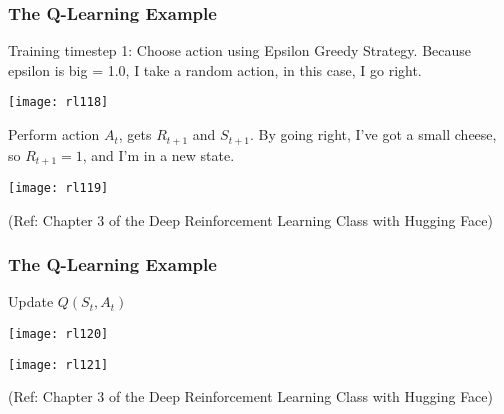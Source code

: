 \begin{frame}[fragile]\frametitle{The Q-Learning Example}

Training timestep 1: Choose action using Epsilon Greedy Strategy. Because epsilon is big = 1.0, I take a random action, in this case, I go right.

\begin{center}
\texttt{[image: rl118]}
\end{center}

Perform action $A_t$, gets $R_{t+1}$ and $S_{t+1}$. By going right, I've got a small cheese, so $R_{t+1} = 1$, and I'm in a new state.

\begin{center}
\texttt{[image: rl119]}
\end{center}

{\tiny (Ref: Chapter 3 of the Deep Reinforcement Learning Class with Hugging Face)}

\end{frame}


\begin{frame}[fragile]\frametitle{The Q-Learning Example}

Update $Q(S_t, A_t)$

\begin{center}
\texttt{[image: rl120]}

\texttt{[image: rl121]}

\end{center}


{\tiny (Ref: Chapter 3 of the Deep Reinforcement Learning Class with Hugging Face)}

\end{frame}



